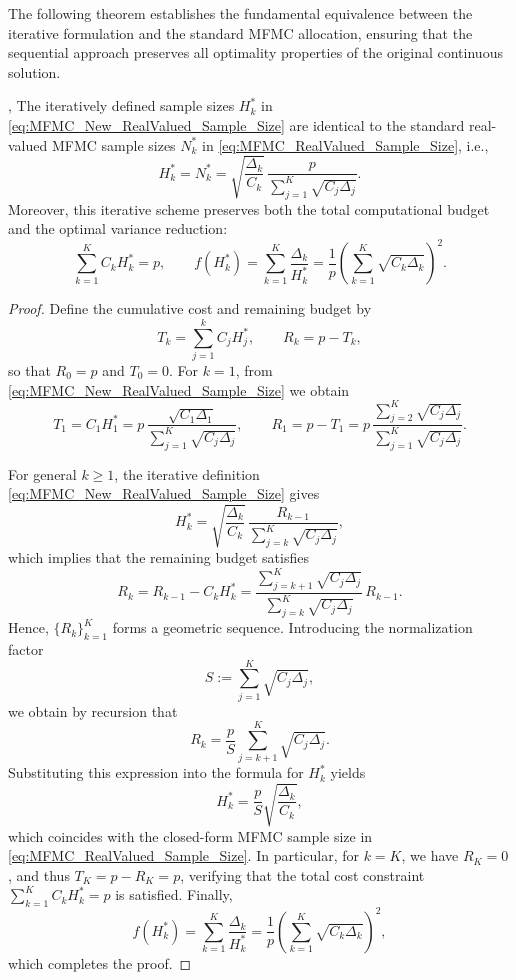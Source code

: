 The following theorem establishes the fundamental equivalence between the iterative formulation and the standard MFMC allocation, ensuring that the sequential approach preserves all optimality properties of the original continuous solution.

%
\begin{theorem}\label{thm:MFMC_Iterative_RealValued_Sample_Size}
,
The iteratively defined sample sizes $H_k^*$ in \eqref{eq:MFMC_New_RealValued_Sample_Size} are identical to the standard real-valued MFMC sample sizes $N_k^*$ in \eqref{eq:MFMC_RealValued_Sample_Size}, i.e.,
\[
H_k^* = N_k^*
    = \sqrt{\frac{\Delta_k}{C_k}}\,
      \frac{p}{\sum_{j=1}^K \sqrt{C_j\Delta_j}}.
\]
Moreover, this iterative scheme preserves both the total computational budget and the optimal variance reduction:
\[
\sum_{k=1}^K C_k H_k^* = p, 
\qquad  
f(H_k^*) = \sum_{k=1}^K \frac{\Delta_k}{H_k^*} = \frac{1}{p} \left(\sum_{k=1}^K \sqrt{C_k\Delta_k}\right)^2.
\]
\end{theorem}
%


\begin{proof}
Define the cumulative cost and remaining budget by
\[
    T_k = \sum_{j=1}^k C_j H_j^*, 
    \qquad 
    R_k = p - T_k,
\]
so that $R_0 = p$ and $T_0 = 0$. For $k=1$, from \eqref{eq:MFMC_New_RealValued_Sample_Size} we obtain
\[
    T_1 = C_1H_1^* 
    = p\,\frac{\sqrt{C_1\Delta_1}}{\sum_{j=1}^K \sqrt{C_j\Delta_j}},
    \qquad
    R_1 = p - T_1
    = p\,\frac{\sum_{j=2}^K \sqrt{C_j\Delta_j}}{\sum_{j=1}^K \sqrt{C_j\Delta_j}}.
\]

For general $k\ge 1$, the iterative definition \eqref{eq:MFMC_New_RealValued_Sample_Size} gives
\[
    H_k^*
    = \sqrt{\frac{\Delta_k}{C_k}}\,
      \frac{R_{k-1}}{\sum_{j=k}^K \sqrt{C_j \Delta_j}},
\]
which implies that the remaining budget satisfies
\[
    R_k 
    = R_{k-1} - C_k H_k^*
    = \frac{\sum_{j=k+1}^K \sqrt{C_j \Delta_j}}
           {\sum_{j=k}^K \sqrt{C_j \Delta_j}} \, R_{k-1}.
\]
Hence, $\{R_k\}_{k=1}^K$ forms a geometric sequence. Introducing the normalization factor
\begin{equation}\label{eq:aggregate_cost_variance_weight_S}
    S := \sum_{j=1}^K \sqrt{C_j \Delta_j},
\end{equation}
we obtain by recursion that
\[
    R_k = \frac{p}{S}\sum_{j=k+1}^K\sqrt{C_j\Delta_j}.
\]
Substituting this expression into the formula for $H_k^*$ yields
\[
    H_k^*
    = \frac{p}{S}\sqrt{\frac{\Delta_k}{C_k}},
\]
which coincides with the closed-form MFMC sample size in \eqref{eq:MFMC_RealValued_Sample_Size}.  
In particular, for $k=K$, we have $R_K=0$, and thus $T_K = p - R_K = p$, verifying that the total cost constraint $\sum_{k=1}^K C_k H_k^* = p$ is satisfied.  
Finally,
\[
    f(H_k^*)
    = \sum_{k=1}^K \frac{\Delta_k}{H_k^*}
    = \frac{1}{p} \left(\sum_{k=1}^K \sqrt{C_k\Delta_k}\right)^2,
\]
which completes the proof.
\end{proof}

